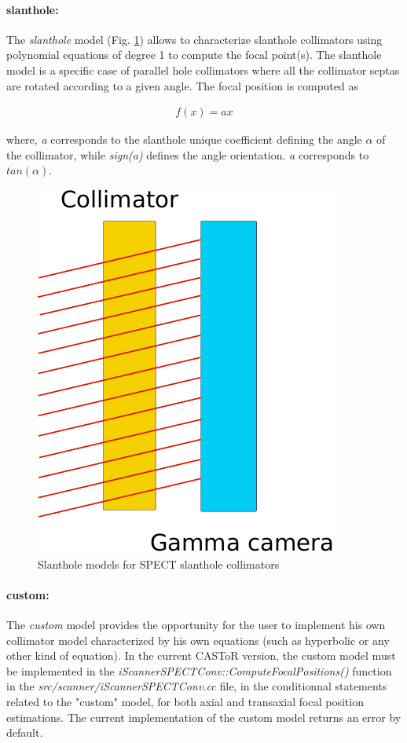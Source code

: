 \documentclass[a4paper, 11pt]{article}
\begin{document}
\paragraph{slanthole:}

The \textit{slanthole} model (Fig. \ref{fig_SPECT_colli_slanthole}) allows to characterize slanthole collimators using polynomial equations
of degree 1 to compute the focal point(s). The slanthole model is a specific case of parallel hole collimators where all the collimator septas
are rotated according to a given angle. The focal position is computed as

\begin{equation}
\begin{aligned}
f(x) = ax
\end{aligned}
\label{eq_sss_SPECT_colli_slant}
\end{equation}

where, \textit{a} corresponds to the slanthole unique coefficient defining the angle $\alpha$ of the collimator, while \textit{sign(a)} defines the angle orientation. \textit{a} corresponds to $tan(\alpha)$. 

\begin{figure} [h!]
  \centering
  \includegraphics[width=0.2\columnwidth]{./figures/spect_colli_slanthole.pdf}
  \caption{Slanthole models for SPECT slanthole collimators}
  \label{fig_SPECT_colli_slanthole}
\end{figure}

\paragraph{custom:}

The \textit{custom} model provides the opportunity for the user to implement his own collimator model characterized by his own equations
(such as hyperbolic or any other kind of equation). In the current CASToR version, the custom model must be implemented in the
\textit{iScannerSPECTConv::ComputeFocalPositions()} function in the \textit{src/scanner/iScannerSPECTConv.cc} file, in the conditionnal
statements related to the "custom" model, for both axial and transaxial focal position estimations. The current implementation of the
custom model returns an error by default.
\end{document}
